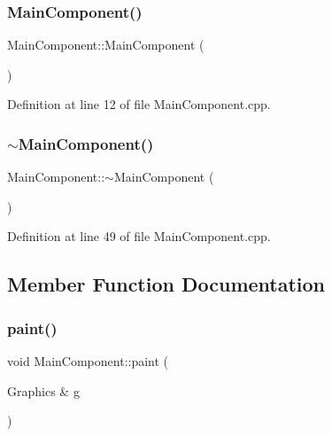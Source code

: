 \subsubsection{\texorpdfstring{Main\+Component()}{MainComponent()}}
{\footnotesize\ttfamily Main\+Component\+::\+Main\+Component (\begin{DoxyParamCaption}{ }\end{DoxyParamCaption})}



Definition at line 12 of file Main\+Component.\+cpp.

\mbox{\label{class_main_component_aa96a2a286f35edf4000deec5f327d1c3}} 
\subsubsection{\texorpdfstring{$\sim$\+Main\+Component()}{~MainComponent()}}
{\footnotesize\ttfamily Main\+Component\+::$\sim$\+Main\+Component (\begin{DoxyParamCaption}{ }\end{DoxyParamCaption})}



Definition at line 49 of file Main\+Component.\+cpp.



\subsection{Member Function Documentation}
\mbox{\label{class_main_component_a413e9316a0332e0522ad69d4f714bfcd}} 
\subsubsection{\texorpdfstring{paint()}{paint()}}
{\footnotesize\ttfamily void Main\+Component\+::paint (\begin{DoxyParamCaption}\item[{Graphics \&}]{g }\end{DoxyParamCaption})\hspace{0.3cm}{\ttfamily [override]}}




